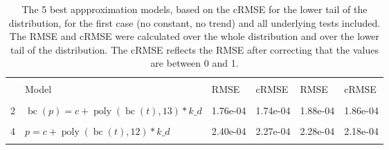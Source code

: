 \documentclass[12pt,a4paper]{article}
\DeclareMathOperator{\bc}{bc}
\DeclareMathOperator{\poly}{poly}
\begin{document}
\FloatBarrier
\begin{table}[!h]

\caption{\label{tab:5 best all_1}\label{tab:best_all_1} The 5 best appproximation models, based on the cRMSE for the lower tail of the distribution, for the first case (no constant, no trend) and all underlying tests included. The RMSE and cRMSE were calculated over the whole distribution and over the lower tail of the distribution. The cRMSE reflects the RMSE after correcting that the values are between 0 and 1.}
\centering
\fontsize{10}{12}\selectfont
\begin{tabular}[t]{ll>{\raggedleft\arraybackslash}p{2cm}>{\raggedleft\arraybackslash}p{2cm}>{\raggedleft\arraybackslash}p{2cm}>{\raggedleft\arraybackslash}p{2cm}}
\toprule
\multicolumn{1}{c}{\textbf{}} & \multicolumn{1}{c}{\textbf{}} & \multicolumn{2}{c}{\textbf{Full Distribution}} & \multicolumn{2}{c}{\textbf{Lower Tail ($p \leq 0.2$)}} \\
\cmidrule(l{3pt}r{3pt}){3-4} \cmidrule(l{3pt}r{3pt}){5-6}
  & Model & RMSE & cRMSE & RMSE & cRMSE\\
\midrule
\cellcolor{gray!6}{1} & \cellcolor{gray!6}{$p = c + \poly\left( \bc(t), 13 \right) * k\_d$} & \cellcolor{gray!6}{1.79e-04} & \cellcolor{gray!6}{1.73e-04} & \cellcolor{gray!6}{1.73e-04} & \cellcolor{gray!6}{1.71e-04}\\
2 & $\bc(p) = c + \poly\left( \bc(t), 13 \right) * k\_d$ & 1.76e-04 & 1.74e-04 & 1.88e-04 & 1.86e-04\\
\cellcolor{gray!6}{3} & \cellcolor{gray!6}{$\bc(p) = c + \poly\left( \bc(t), 12 \right) * k\_d$} & \cellcolor{gray!6}{2.00e-04} & \cellcolor{gray!6}{1.95e-04} & \cellcolor{gray!6}{2.10e-04} & \cellcolor{gray!6}{2.05e-04}\\
4 & $p = c + \poly\left( \bc(t), 12 \right) * k\_d$ & 2.40e-04 & 2.27e-04 & 2.28e-04 & 2.18e-04\\
\cellcolor{gray!6}{5} & \cellcolor{gray!6}{$\bc(p) = c + \poly\left( \bc(t), 11 \right) * k\_d$} & \cellcolor{gray!6}{2.16e-04} & \cellcolor{gray!6}{2.09e-04} & \cellcolor{gray!6}{2.28e-04} & \cellcolor{gray!6}{2.19e-04}\\
\bottomrule
\end{tabular}
\end{table}

\begingroup\fontsize{10}{12}\selectfont
\end{document}

